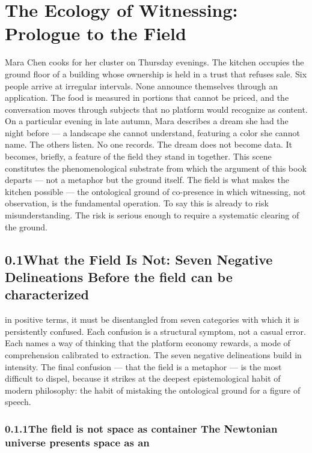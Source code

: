 \chapter{The Ecology of Witnessing: Prologue to the Field}
\label{ch:01}

Mara Chen cooks for her cluster on Thursday evenings. The kitchen occupies the ground floor of a building whose ownership is held in a trust that refuses sale. Six people arrive at irregular intervals. None announce themselves through an application. The food is measured in portions that cannot be priced, and the conversation moves through subjects that no platform would recognize as content. On a particular evening in late autumn, Mara describes a dream she had the night before — a landscape she cannot understand, featuring a color she cannot name. The others listen. No one records. The dream does not become data. It becomes, briefly, a feature of the field they stand in together. This scene constitutes the phenomenological substrate from which the argument of this book departs — not a metaphor but the ground itself. The field is what makes the kitchen possible — the ontological ground of co-presence in which witnessing, not observation, is the fundamental operation. To say this is already to risk misunderstanding. The risk is serious enough to require a systematic clearing of the ground.

\section{0.1\quad What the Field Is Not: Seven Negative Delineations Before the field can be characterized}

in positive terms, it must be disentangled from seven categories with which it is persistently confused. Each confusion is a structural symptom, not a casual error. Each names a way of thinking that the platform economy rewards, a mode of comprehension calibrated to extraction. The seven negative delineations build in intensity. The final confusion — that the field is a metaphor — is the most difficult to dispel, because it strikes at the deepest epistemological habit of modern philosophy: the habit of mistaking the ontological ground for a figure of speech.

\subsection{0.1.1\quad The field is not space as container The Newtonian universe presents space as an}

